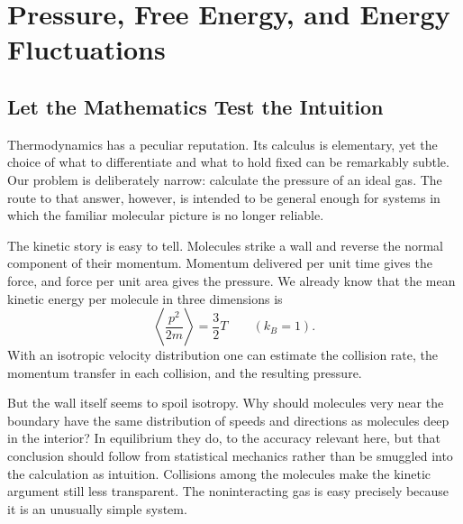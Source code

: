 \chapter{Pressure, Free Energy, and Energy Fluctuations}


\section{Let the Mathematics Test the Intuition}

Thermodynamics has a peculiar reputation.  Its calculus is elementary, yet
the choice of what to differentiate and what to hold fixed can be remarkably
subtle.  Our problem is deliberately narrow: calculate the pressure of an
ideal gas.  The route to that answer, however, is intended to be general
enough for systems in which the familiar molecular picture is no longer
reliable.

The kinetic story is easy to tell.  Molecules strike a wall and reverse the
normal component of their momentum.  Momentum delivered per unit time gives
the force, and force per unit area gives the pressure.  We already know that
the mean kinetic energy per molecule in three dimensions is
\begin{equation}
 \left\langle \frac{p^2}{2m}\right\rangle=\frac{3}{2}T
 \qquad (k_B=1).
 \label{eq:sm5-mean-kinetic-energy}
\end{equation}
With an isotropic velocity distribution one can estimate the collision rate,
the momentum transfer in each collision, and the resulting pressure.

But the wall itself seems to spoil isotropy.  Why should molecules very near
the boundary have the same distribution of speeds and directions as
molecules deep in the interior?  In equilibrium they do, to the accuracy
relevant here, but that conclusion should follow from statistical mechanics
rather than be smuggled into the calculation as intuition.  Collisions among
the molecules make the kinetic argument still less transparent.  The
noninteracting gas is easy precisely because it is an unusually simple
system.

